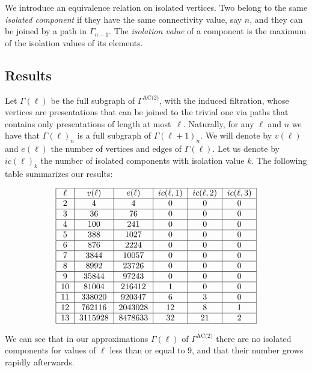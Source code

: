 We introduce an equivalence relation on isolated vertices.
Two belong to the same \textit{isolated component} if they have the same connectivity value, say $n$, and they can be joined by a path in $\Gamma_{n-1}$.
The \textit{isolation value} of a component is the maximum of the isolation values of its elements.

\subsection{Results}

Let $\Gamma(\ell)$ be the full subgraph of $\Gamma^{\text{AC(2)}}$, with the induced filtration, whose vertices are presentations that can be joined to the trivial one via paths that contains only presentations of length at most~$\ell$.
Naturally, for any $\ell$ and $n$ we have that $\Gamma(\ell)_n$ is a full subgraph of $\Gamma(\ell+1)_n$.
We will denote by $v(\ell)$ and $e(\ell)$ the number of vertices and edges of $\Gamma(\ell)$.
Let us denote by $ic(\ell)_k$ the number of isolated components with isolation value $k$.
The following table summarizes our results:

\[
\begin{tabular}{|c|c|c|c|c|c|}
	\hline
	$\ell$ & $v(\ell)$ & $e(\ell)$ & $ic(\ell,1)$ & $ic(\ell,2)$ & $ic(\ell,3)$ \\ \hline
	2 & 4 & 4 & 0 & 0 & 0 \\ \hline
	3 & 36 & 76 & 0 & 0 & 0 \\ \hline
	4 & 100 & 241 & 0 & 0 & 0 \\ \hline
	5 & 388 & 1027 & 0 & 0 & 0 \\ \hline
	6 & 876 & 2224 & 0 & 0 & 0 \\ \hline
	7 & 3844 & 10057 & 0 & 0 & 0 \\ \hline
	8 & 8992 & 23726 & 0 & 0 & 0 \\ \hline
	9 & 35844 & 97243 & 0 & 0 & 0 \\ \hline
	10 & 81004 & 216412 & 1 & 0 & 0 \\ \hline
	11 & 338020 & 920347 & 6 & 3 & 0 \\ \hline
	12 & 762116 & 2043028 & 12 & 8 & 1 \\ \hline
	13 & 3115928 & 8478633 & 32 & 21 & 2 \\ \hline
\end{tabular}
\]

\medskip We can see that in our approximations $\Gamma(\ell)$ of $\Gamma^{\text{AC(2)}}$ there are no isolated components for values of $\ell$ less than or equal to $9$, and that their number grows rapidly afterwards.

